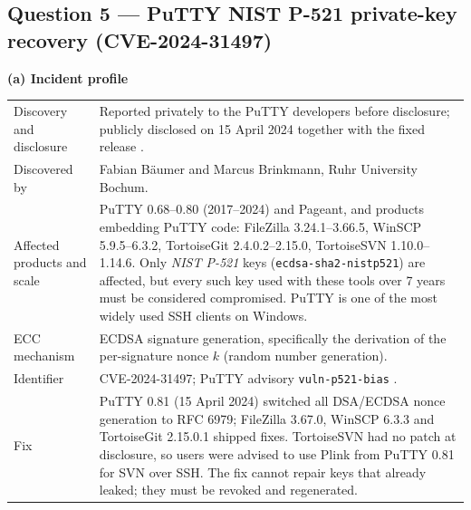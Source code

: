 \documentclass[11pt,a4paper]{article}
\begin{document}
\subsection*{Question 5 --- PuTTY NIST P-521 private-key recovery (CVE-2024-31497)}
\begin{table}[H]
\textbf{(a) Incident profile}\par\smallskip
\centering\small
\begin{tabularx}{\textwidth}{@{}>{\raggedright\arraybackslash}p{3.6cm}L@{}}
\toprule
Discovery and disclosure & Reported privately to the PuTTY developers before disclosure; publicly disclosed on 15 April 2024 together with the fixed release \cite{puttyadv,oss}. \\
Discovered by & Fabian B\"aumer and Marcus Brinkmann, Ruhr University Bochum. \\
Affected products and scale & PuTTY 0.68--0.80 (2017--2024) and Pageant, and products embedding PuTTY code: FileZilla 3.24.1--3.66.5, WinSCP 5.9.5--6.3.2, TortoiseGit 2.4.0.2--2.15.0, TortoiseSVN 1.10.0--1.14.6. Only \emph{NIST P-521} keys (\texttt{ecdsa-sha2-nistp521}) are affected, but every such key used with these tools over 7 years must be considered compromised. PuTTY is one of the most widely used SSH clients on Windows. \\
ECC mechanism & ECDSA signature generation, specifically the derivation of the per-signature nonce $k$ (random number generation). \\
Identifier & CVE-2024-31497; PuTTY advisory \texttt{vuln-p521-bias} \cite{nvd,puttyadv}. \\
Fix & PuTTY 0.81 (15 April 2024) switched all DSA/ECDSA nonce generation to RFC 6979; FileZilla 3.67.0, WinSCP 6.3.3 and TortoiseGit 2.15.0.1 shipped fixes. TortoiseSVN had no patch at disclosure, so users were advised to use Plink from PuTTY 0.81 for SVN over SSH. The fix cannot repair keys that already leaked; they must be revoked and regenerated. \\
\bottomrule
\end{tabularx}
\end{table}
\end{document}
